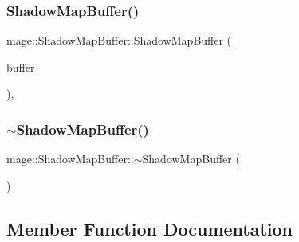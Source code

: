 \hypertarget{structmage_1_1_shadow_map_buffer_a0aa29978a2c482614aa1c46e9be0b50a}{}\label{structmage_1_1_shadow_map_buffer_a0aa29978a2c482614aa1c46e9be0b50a} 
\subsubsection{\texorpdfstring{Shadow\+Map\+Buffer()}{ShadowMapBuffer()}\hspace{0.1cm}{\footnotesize\ttfamily [4/4]}}
{\footnotesize\ttfamily mage\+::\+Shadow\+Map\+Buffer\+::\+Shadow\+Map\+Buffer (\begin{DoxyParamCaption}\item[{\hyperlink{structmage_1_1_shadow_map_buffer}{Shadow\+Map\+Buffer} \&\&}]{buffer }\end{DoxyParamCaption})\hspace{0.3cm}{\ttfamily [default]}, {\ttfamily [noexcept]}}

\hypertarget{structmage_1_1_shadow_map_buffer_a34eedd164d45a009ddecc97c8739c80b}{}\label{structmage_1_1_shadow_map_buffer_a34eedd164d45a009ddecc97c8739c80b} 
\subsubsection{\texorpdfstring{$\sim$\+Shadow\+Map\+Buffer()}{~ShadowMapBuffer()}}
{\footnotesize\ttfamily mage\+::\+Shadow\+Map\+Buffer\+::$\sim$\+Shadow\+Map\+Buffer (\begin{DoxyParamCaption}{ }\end{DoxyParamCaption})\hspace{0.3cm}{\ttfamily [default]}}



\subsection{Member Function Documentation}
\hypertarget{structmage_1_1_shadow_map_buffer_a8e23dccfa670bdb4a698977b7524434e}{}\label{structmage_1_1_shadow_map_buffer_a8e23dccfa670bdb4a698977b7524434e} 
